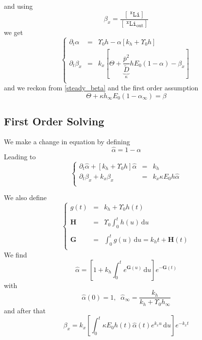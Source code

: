 \documentclass[aps,onecolumn,12pt]{revtex4}
\newcommand{\mychem}[1]{\mathtt{#1}}
\newcommand{\myconc}[1]{\left\lbrack{#1}\right\rbrack}
\newcommand{\spLi}[1]{{~^{\mychem{#1}}\mychem{Li}}}
\newcommand{\Li}[1]{\myconc{\spLi{#1}}}
\newcommand{\spLiOut}[1]{{\spLi{#1}}_{\mathrm{out}}}
\newcommand{\LiOut}[1]{\myconc{\spLiOut{#1}}}
\newcommand{\ih}{\ensuremath{\mathbf{H}}}
\newcommand{\ig}{\ensuremath{\mathbf{G}}}
\begin{document}
and using 
\begin{equation}
	\beta_x = \dfrac{\Li{x}}{\LiOut{x}}
\end{equation}
we get
\begin{equation}
\left\lbrace
\begin{array}{rcl}
\partial_t \alpha & = & \Upsilon_0 h - \alpha\left\lbrack k_h+\Upsilon_0 h  \right\rbrack\\
\partial_t\beta_x & = & k_x \left\lbrack
{\Theta + \underbrace{\dfrac{\bar{p}^2}{\tilde{D}}}_{\kappa} h E_0  \left(1-\alpha\right)}
- \beta_x
\right\rbrack \\
\end{array}
\right.
\end{equation}
and we reckon from \eqref{steady_beta} and the first order assumption
\begin{equation}
	\Theta + \kappa h_\infty E_0  \left(1-\alpha_\infty\right) = \beta 
\end{equation}

\subsection{First Order Solving}

We make a change in equation by defining
\begin{equation}
	\hat{\alpha} = 1-\alpha
\end{equation}
Leading to
\begin{equation}
\displaystyle
\left\lbrace
\begin{array}{rcl}
\partial_t \hat\alpha + \left\lbrack k_h+\Upsilon_0 h  \right\rbrack \hat{\alpha} & = & k_h\\
\partial_t \beta_x + k_x \beta_x & = & k_x \kappa E_0 h \hat\alpha \\
\end{array}
\right.
\end{equation}

We also define
\begin{equation}
\left\lbrace
\begin{array}{rcl}
g(t) & = & k_h + \Upsilon_0 h(t) \\
\\
\ih  & = & \displaystyle \Upsilon_0\int_0^t h(u) \, \mathrm{d}u\\
\\
\ig  & = &  \displaystyle \int_0^t g(u) \, \mathrm{d}u = k_h t +  \ih(t)\\
\end{array}
\right.
\end{equation}
We find
\begin{equation}
	\hat\alpha = \left[ 1 + k_h \int_0^t e^{\ig(u)}\,\mathrm{d}u \right] e^{-\ig(t)}
\end{equation}
with
\begin{equation}
	\hat\alpha(0) = 1,\;\;\hat\alpha_\infty = \dfrac{k_h}{k_h+\Upsilon_0 h_\infty}
\end{equation}
and after that
\begin{equation}
\beta_x = k_x\left[\int_0^t \kappa E_0 h(t) \hat\alpha(t) e^{k_xu} \, \mathrm{d}u\right] e^{-k_xt}
\end{equation}
\end{document}
